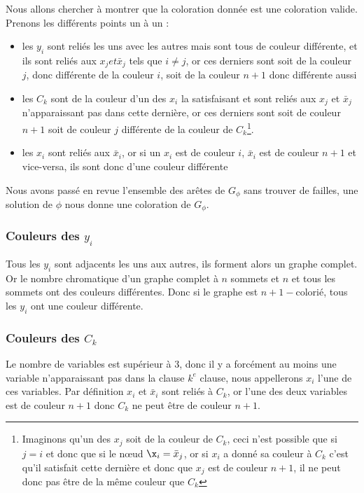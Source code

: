 Nous allons chercher à montrer que la coloration donnée est une coloration valide.
Prenons les différents points un à un : 
\begin{itemize}
	\item les $y_i$ sont reliés les uns avec les autres mais sont tous de couleur différente, et ils
		sont reliés aux $x_j et \bar x_j$ tels que $i \not = j$, or ces derniers sont soit de la couleur
		$j$, donc différente de la couleur $i$, soit de la couleur $n+1$ donc différente aussi
	\item les $C_k$ sont de la couleur d'un des $x_i$ la satisfaisant et sont reliés aux $x_j$ et
		$\bar x_j$ n'apparaissant pas dans cette dernière, or ces derniers sont soit de couleur $n+1$
		soit de couleur $j$ différente de la couleur de $C_k$\footnote{Imaginons qu'un des $x_j$ soit de
			la couleur de $C_k$, ceci n'est possible que si $j = i$ et donc que si le n\oe ud $\x_i = \bar
			x_j$, or si $x_i$ a donné sa couleur à $C_k$ c'est qu'il satisfait cette dernière et donc que
		$x_j$ est de couleur $n+1$, il ne peut donc pas être de la même couleur que $C_k$ }.
	\item les $x_i$ sont reliés aux $\bar x_i$, or si un $x_i$ est de couleur $i$, $\bar x_i$ est de
		couleur $n+1$ et vice-versa, ils sont donc d'une couleur différente
\end{itemize}

Nous avons passé en revue l'ensemble des arêtes de $G_\phi$ sans trouver de failles, une solution de
$\phi$ nous donne une coloration de $G_\phi$.

\subsubsection{Couleurs des $y_i$}

Tous les $y_i$ sont adjacents les uns aux autres, ils forment alors un graphe complet. Or le nombre
chromatique d'un graphe complet à $n$ sommets et $n$ et tous les sommets ont des couleurs
différentes. Donc si le graphe est $n+1-$colorié, tous les $y_i$ ont une couleur différente.

\subsubsection{Couleurs des $C_k$}

Le nombre de variables est supérieur à 3, donc il y a forcément au moins une variable n'apparaissant
pas dans la clause $k^e$ clause, nous appellerons $x_i$ l'une de ces variables. Par définition $x_i$
et $\bar x_i$ sont reliés à $C_k$, or l'une des deux variables est de couleur $n+1$ donc $C_k$ ne
peut être de couleur $n+1$.

